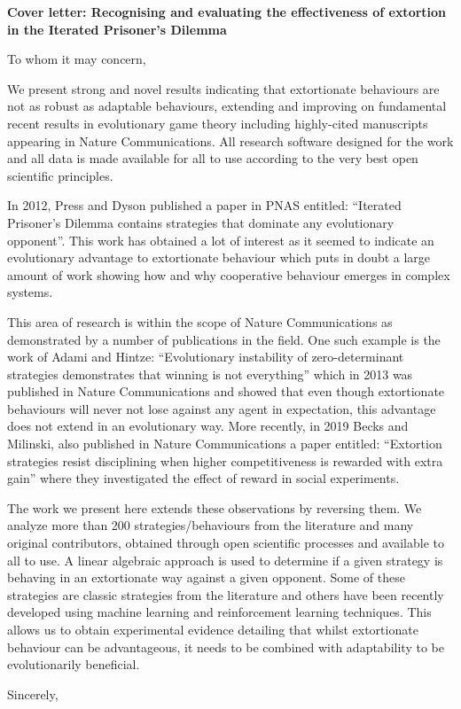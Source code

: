 \documentclass[11pt]{letter}
\begin{document}
\signature{The authors}

\begin{letter}{}

\textbf{Cover letter: Recognising and evaluating the effectiveness
       of extortion in the Iterated Prisoner's Dilemma}

To whom it may concern,

We present strong and novel results indicating that extortionate behaviours are
not as robust as adaptable behaviours, extending and improving on fundamental
recent results in evolutionary game theory including highly-cited manuscripts
appearing in Nature Communications. All research software designed for the work
and all data is made available for all to use according to the very best open
scientific principles.

In 2012, Press and Dyson published a paper in PNAS entitled: ``Iterated
Prisoner’s Dilemma contains strategies that dominate any evolutionary
opponent''. This work has obtained a lot of interest as it seemed to indicate an
evolutionary advantage to extortionate behaviour which puts in doubt a
large amount of work showing how and why cooperative behaviour emerges in
complex systems.

This area of research is within the scope of Nature Communications as
demonstrated by a number of publications in the field. One such example is the work
of Adami and Hintze: ``Evolutionary instability of zero-determinant strategies
demonstrates that winning is not everything'' which in 2013 was published in
Nature Communications and showed that even though extortionate behaviours will never
not lose against any agent in expectation, this advantage does not extend in an
evolutionary way. More recently, in 2019 Becks and Milinski, also published in
Nature Communications a paper entitled: ``Extortion strategies resist
disciplining when higher competitiveness is rewarded with extra gain'' where
they investigated the effect of reward in social
experiments.

The work we present here extends these observations by reversing them. We
analyze more than 200 strategies/behaviours from the literature and many
original contributors, obtained through open scientific processes and available
to all to use. A linear algebraic approach is used to determine if a given
strategy is behaving in an extortionate way against a given opponent. Some of
these strategies are
classic strategies from the literature and others have been recently developed
using machine learning and reinforcement learning techniques. This allows us to
obtain experimental evidence detailing that whilst extortionate behaviour can be
advantageous, it needs to be combined with adaptability to be evolutionarily
beneficial.

\closing{Sincerely,}

\end{letter}
\end{document}
